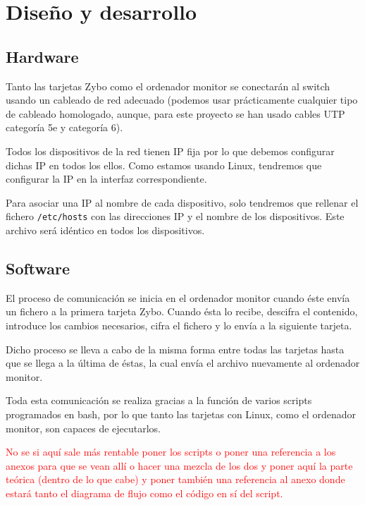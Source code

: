 \section{Diseño y desarrollo}
\subsection{Hardware}
Tanto las tarjetas Zybo como el ordenador monitor se conectarán al switch usando un cableado de red adecuado (podemos usar prácticamente cualquier tipo de cableado homologado, aunque, para este proyecto se han usado cables UTP categoría 5e y categoría 6).

Todos los dispositivos de la red tienen IP fija por lo que debemos configurar dichas IP en todos los ellos. Como estamos usando Linux, tendremos que configurar la IP en la interfaz correspondiente.

Para asociar una IP al nombre de cada dispositivo, solo tendremos que rellenar el fichero \texttt{/etc/hosts} con las direcciones IP y el nombre de los dispositivos. Este archivo será idéntico en todos los dispositivos.

\subsection{Software}
El proceso de comunicación se inicia en el ordenador monitor cuando éste envía un fichero a la primera tarjeta Zybo. Cuando ésta lo recibe, descifra el contenido, introduce los cambios necesarios, cifra el fichero y lo envía a la siguiente tarjeta.

Dicho proceso se lleva a cabo de la misma forma entre todas las tarjetas hasta que se llega a la última de éstas, la cual envía el archivo nuevamente al ordenador monitor.

Toda esta comunicación se realiza gracias a la función de varios scripts programados en bash, por lo que tanto las tarjetas con Linux, como el ordenador monitor, son capaces de ejecutarlos.

\textcolor{red}{No se si aquí sale más rentable poner los scripts o poner una referencia a los anexos para que se vean allí o hacer una mezcla de los dos y poner aquí la parte teórica (dentro de lo que cabe) y poner también una referencia al anexo donde estará tanto el diagrama de flujo como el código en sí del script.}